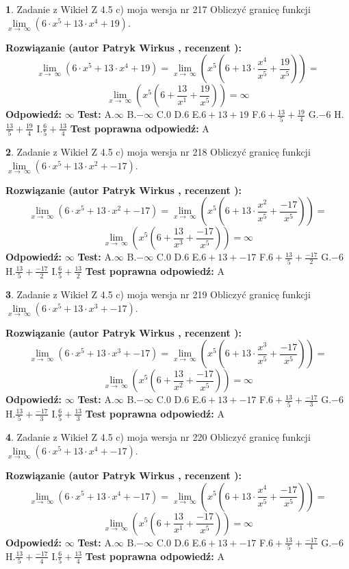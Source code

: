 \documentclass[12pt, a4paper]{article}
\theoremstyle{definition} %
\newtheorem{zad}{}
\newcommand{\zadStart}[1]{\begin{zad}#1\newline}
\newcommand{\zadStop}{\end{zad}}
\newcommand{\rozwStart}[2]{\noindent \textbf{Rozwiązanie (autor #1 , recenzent #2): }\newline}
\newcommand{\rozwStop}{\newline}
\newcommand{\odpStart}{\noindent \textbf{Odpowiedź:}\newline}
\newcommand{\odpStop}{\newline}
\newcommand{\testStart}{\noindent \textbf{Test:}\newline}
\newcommand{\testStop}{\newline}
\newcommand{\kluczStart}{\noindent \textbf{Test poprawna odpowiedź:}\newline}
\newcommand{\kluczStop}{\newline}
\begin{document}
\zadStart{Zadanie z Wikieł Z 4.5 c) moja wersja nr 217}
Obliczyć granicę funkcji  $\lim\limits_{x\to\ \infty}(6 \cdot x^{5}+13 \cdot x^{4}+19)$.
\zadStop
\rozwStart{Patryk Wirkus}{}
$$\lim\limits_{x\to\ \infty}(6 \cdot x^{5}+13 \cdot x^{4}+19) = \lim\limits_{x\to\ \infty}(x^{5}(6 +13 \cdot \frac{x^{4}}{x^{5}}+\frac{19}{x^{5}})) =$$ $$\lim\limits_{x\to\ \infty}(x^{5}(6 +\frac{13}{x^{1}}+\frac{19}{x^{5}})) =\infty$$
\rozwStop
\odpStart
$\infty$
\odpStop
\testStart
A.$\infty$ B.$-\infty$ C.$0$ D.$6$ E.$6 + 13 + 19$
F.$6+\frac{13}{5}+\frac{19}{4}$ G.$-6$
H.$\frac{13}{5}+\frac{19}{4}$
I.$\frac{6}{5}+\frac{13}{4}$
\testStop
\kluczStart
A
\kluczStop



\zadStart{Zadanie z Wikieł Z 4.5 c) moja wersja nr 218}
Obliczyć granicę funkcji  $\lim\limits_{x\to\ \infty}(6 \cdot x^{5}+13 \cdot x^{2}+-17)$.
\zadStop
\rozwStart{Patryk Wirkus}{}
$$\lim\limits_{x\to\ \infty}(6 \cdot x^{5}+13 \cdot x^{2}+-17) = \lim\limits_{x\to\ \infty}(x^{5}(6 +13 \cdot \frac{x^{2}}{x^{5}}+\frac{-17}{x^{5}})) =$$ $$\lim\limits_{x\to\ \infty}(x^{5}(6 +\frac{13}{x^{3}}+\frac{-17}{x^{5}})) =\infty$$
\rozwStop
\odpStart
$\infty$
\odpStop
\testStart
A.$\infty$ B.$-\infty$ C.$0$ D.$6$ E.$6 + 13 + -17$
F.$6+\frac{13}{5}+\frac{-17}{2}$ G.$-6$
H.$\frac{13}{5}+\frac{-17}{2}$
I.$\frac{6}{5}+\frac{13}{2}$
\testStop
\kluczStart
A
\kluczStop



\zadStart{Zadanie z Wikieł Z 4.5 c) moja wersja nr 219}
Obliczyć granicę funkcji  $\lim\limits_{x\to\ \infty}(6 \cdot x^{5}+13 \cdot x^{3}+-17)$.
\zadStop
\rozwStart{Patryk Wirkus}{}
$$\lim\limits_{x\to\ \infty}(6 \cdot x^{5}+13 \cdot x^{3}+-17) = \lim\limits_{x\to\ \infty}(x^{5}(6 +13 \cdot \frac{x^{3}}{x^{5}}+\frac{-17}{x^{5}})) =$$ $$\lim\limits_{x\to\ \infty}(x^{5}(6 +\frac{13}{x^{2}}+\frac{-17}{x^{5}})) =\infty$$
\rozwStop
\odpStart
$\infty$
\odpStop
\testStart
A.$\infty$ B.$-\infty$ C.$0$ D.$6$ E.$6 + 13 + -17$
F.$6+\frac{13}{5}+\frac{-17}{3}$ G.$-6$
H.$\frac{13}{5}+\frac{-17}{3}$
I.$\frac{6}{5}+\frac{13}{3}$
\testStop
\kluczStart
A
\kluczStop



\zadStart{Zadanie z Wikieł Z 4.5 c) moja wersja nr 220}
Obliczyć granicę funkcji  $\lim\limits_{x\to\ \infty}(6 \cdot x^{5}+13 \cdot x^{4}+-17)$.
\zadStop
\rozwStart{Patryk Wirkus}{}
$$\lim\limits_{x\to\ \infty}(6 \cdot x^{5}+13 \cdot x^{4}+-17) = \lim\limits_{x\to\ \infty}(x^{5}(6 +13 \cdot \frac{x^{4}}{x^{5}}+\frac{-17}{x^{5}})) =$$ $$\lim\limits_{x\to\ \infty}(x^{5}(6 +\frac{13}{x^{1}}+\frac{-17}{x^{5}})) =\infty$$
\rozwStop
\odpStart
$\infty$
\odpStop
\testStart
A.$\infty$ B.$-\infty$ C.$0$ D.$6$ E.$6 + 13 + -17$
F.$6+\frac{13}{5}+\frac{-17}{4}$ G.$-6$
H.$\frac{13}{5}+\frac{-17}{4}$
I.$\frac{6}{5}+\frac{13}{4}$
\testStop
\kluczStart
A
\kluczStop
\end{document}
